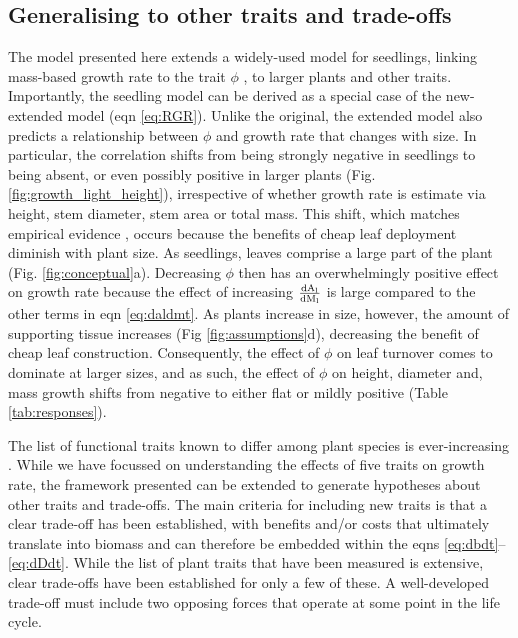 \documentclass[9pt,twocolumn,twoside]{pnas-new}
\newcommand{\ud}{\ensuremath{\rm{d}}}
\begin{document}
\subsection{Generalising to other traits and trade-offs}

The model presented here extends a widely-used model for seedlings, linking mass-based growth rate to the trait $\phi$ \citep{Lambers-1992, Wright-2000}, to larger plants and other traits. Importantly, the seedling model can be derived as a special case of the new-extended model (eqn \ref{eq:RGR}). Unlike the original, the extended model also predicts a relationship between $\phi$ and growth rate that changes with size. In particular, the correlation shifts from being strongly negative in seedlings to being absent, or even possibly positive in larger plants (Fig. \ref{fig:growth_light_height}), irrespective of whether growth rate is estimate via height, stem diameter, stem area or total mass. This shift, which matches empirical evidence \citep{Poorter-2008, Wright-2010, Herault-2011, Paine-2015, Gibert-2016}, occurs because the benefits of cheap leaf deployment diminish with plant size. As seedlings, leaves comprise a large part of the plant (Fig. \ref{fig:conceptual}a). Decreasing $\phi$ then has an overwhelmingly positive effect on growth rate because the effect of increasing $\frac{\ud A_{\rm l}}{\ud M_{\rm l}}$ is large compared to the other terms in eqn \ref{eq:daldmt}. As plants increase in size, however, the amount of supporting tissue increases (Fig \ref{fig:assumptions}d), decreasing the benefit of cheap leaf construction. Consequently, the effect of $\phi$ on leaf turnover comes to dominate at larger sizes, and as such, the effect of $\phi$ on height, diameter and, mass growth shifts from negative to either flat or mildly positive  (Table \ref{tab:responses}).

The list of functional traits known to differ among plant species is ever-increasing \citep{Perez-2013}. While we have focussed on understanding the effects of five traits on growth rate, the framework presented can be extended to generate hypotheses about other traits and trade-offs. The main criteria for including new traits is that a clear trade-off has been established, with benefits and/or costs that ultimately translate into biomass and can therefore be embedded within the eqns \ref{eq:dbdt}--\ref{eq:dDdt}. While the list of plant traits that have been measured is extensive, clear trade-offs have been established for only a few of these. A well-developed trade-off must include two opposing forces that operate at some point in the life cycle.
\end{document}
